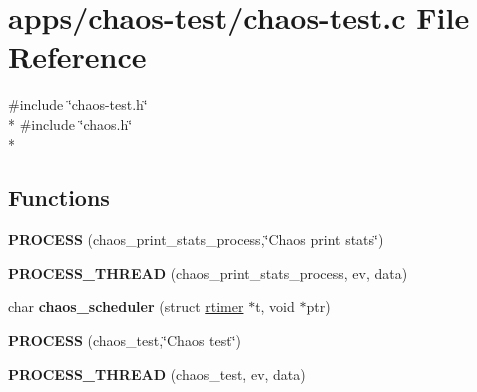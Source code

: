 \hypertarget{chaos-test_8c}{\section{apps/chaos-\/test/chaos-\/test.c File Reference}
\label{chaos-test_8c}
}
{\ttfamily \#include \char`\"{}chaos-\/test.\-h\char`\"{}}\\*
{\ttfamily \#include \char`\"{}chaos.\-h\char`\"{}}\\*
\subsection*{Functions}
\begin{DoxyCompactItemize}
\item 
\hypertarget{group__chaos-test-print-stats_gaba1b7c42a3ed004b9bd807614dad3d68}{{\bfseries P\-R\-O\-C\-E\-S\-S} (chaos\-\_\-print\-\_\-stats\-\_\-process,\char`\"{}Chaos print stats\char`\"{})}\label{group__chaos-test-print-stats_gaba1b7c42a3ed004b9bd807614dad3d68}

\item 
\hypertarget{group__chaos-test-print-stats_ga79876a428d31b2cdf14a94868f871aad}{{\bfseries P\-R\-O\-C\-E\-S\-S\-\_\-\-T\-H\-R\-E\-A\-D} (chaos\-\_\-print\-\_\-stats\-\_\-process, ev, data)}\label{group__chaos-test-print-stats_ga79876a428d31b2cdf14a94868f871aad}

\item 
\hypertarget{group__chaos-test-scheduler_ga321695acf99f30cdff7c24589a573052}{char {\bfseries chaos\-\_\-scheduler} (struct \hyperlink{structrtimer}{rtimer} $\ast$t, void $\ast$ptr)}\label{group__chaos-test-scheduler_ga321695acf99f30cdff7c24589a573052}

\item 
\hypertarget{group__chaos-test-init_ga7aa51b1c2d7f74c96323298782db6694}{{\bfseries P\-R\-O\-C\-E\-S\-S} (chaos\-\_\-test,\char`\"{}Chaos test\char`\"{})}\label{group__chaos-test-init_ga7aa51b1c2d7f74c96323298782db6694}

\item 
\hypertarget{group__chaos-test-init_gabb7d071980914c32831b28eb10dbb042}{{\bfseries P\-R\-O\-C\-E\-S\-S\-\_\-\-T\-H\-R\-E\-A\-D} (chaos\-\_\-test, ev, data)}\label{group__chaos-test-init_gabb7d071980914c32831b28eb10dbb042}

\end{DoxyCompactItemize}
